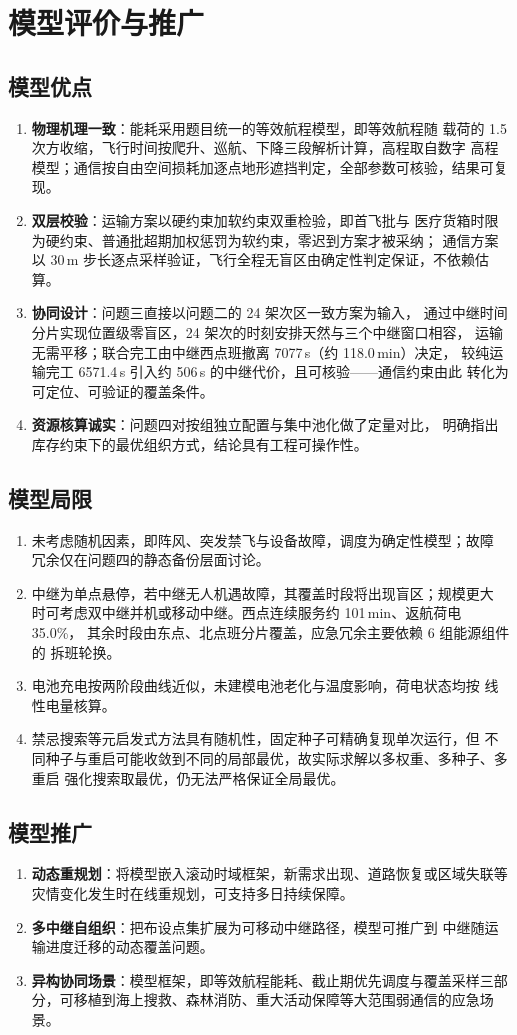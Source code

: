 \section{模型评价与推广}
\label{sec:eval}

\subsection{模型优点}

\begin{enumerate}
\item \textbf{物理机理一致}：能耗采用题目统一的等效航程模型，即等效航程随
载荷的 1.5 次方收缩，飞行时间按爬升、巡航、下降三段解析计算，高程取自数字
高程模型；通信按自由空间损耗加逐点地形遮挡判定，全部参数可核验，结果可复现。
\item \textbf{双层校验}：运输方案以硬约束加软约束双重检验，即首飞批与
医疗货箱时限为硬约束、普通批超期加权惩罚为软约束，零迟到方案才被采纳；
通信方案以 30\,m 步长逐点采样验证，飞行全程无盲区由确定性判定保证，不依赖估算。
\item \textbf{协同设计}：问题三直接以问题二的 24 架次区一致方案为输入，
通过中继时间分片实现位置级零盲区，24 架次的时刻安排天然与三个中继窗口相容，
运输无需平移；联合完工由中继西点班撤离 7077\,s（约 118.0\,min）决定，
较纯运输完工 6571.4\,s 引入约 506\,s 的中继代价，且可核验——通信约束由此
转化为可定位、可验证的覆盖条件。
\item \textbf{资源核算诚实}：问题四对按组独立配置与集中池化做了定量对比，
明确指出库存约束下的最优组织方式，结论具有工程可操作性。
\end{enumerate}

\subsection{模型局限}

\begin{enumerate}
\item 未考虑随机因素，即阵风、突发禁飞与设备故障，调度为确定性模型；故障
冗余仅在问题四的静态备份层面讨论。
\item 中继为单点悬停，若中继无人机遇故障，其覆盖时段将出现盲区；规模更大
时可考虑双中继并机或移动中继。西点连续服务约 101\,min、返航荷电 35.0\%，
其余时段由东点、北点班分片覆盖，应急冗余主要依赖 6 组能源组件的
拆班轮换。
\item 电池充电按两阶段曲线近似，未建模电池老化与温度影响，荷电状态均按
线性电量核算。
\item 禁忌搜索等元启发式方法具有随机性，固定种子可精确复现单次运行，但
不同种子与重启可能收敛到不同的局部最优，故实际求解以多权重、多种子、多重启
强化搜索取最优，仍无法严格保证全局最优。
\end{enumerate}

\subsection{模型推广}

\begin{enumerate}
\item \textbf{动态重规划}：将模型嵌入滚动时域框架，新需求出现、道路恢复或区域失联等灾情变化发生时在线重规划，可支持多日持续保障。
\item \textbf{多中继自组织}：把布设点集扩展为可移动中继路径，模型可推广到
中继随运输进度迁移的动态覆盖问题。
\item \textbf{异构协同场景}：模型框架，即等效航程能耗、截止期优先调度与覆盖采样三部分，可移植到海上搜救、森林消防、重大活动保障等大范围弱通信的应急场景。
\end{enumerate}